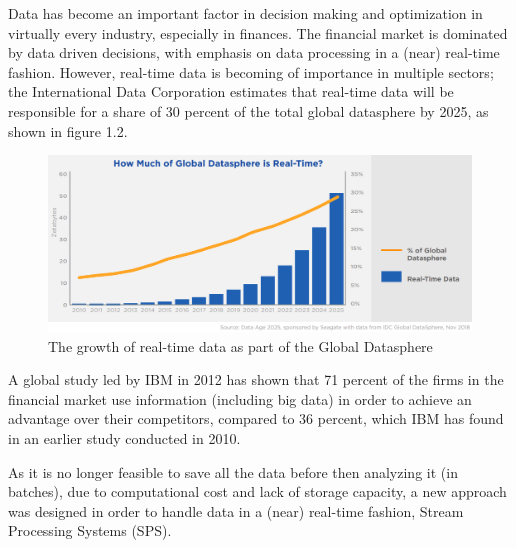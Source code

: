 Data has become an important factor in decision making and optimization in virtually every industry, especially in finances. 
The financial market is dominated by data driven decisions, with emphasis on data processing in a (near) real-time fashion.
However, real-time data is becoming of importance in multiple sectors; the International Data Corporation estimates that real-time data will be 
responsible for a share of 30 percent of the total global datasphere by 2025, as shown in figure 1.2.
\begin{figure}[h]
\centering
\includegraphics[width=1.0\textwidth]{Bilder/realtime_data.png}
\caption{The growth of real-time data as part of the Global Datasphere \cite[p.13]{idc-seagate-data}}
\label{fig:growth_realtime_data}
\end{figure}

A global study led by IBM in 2012 has shown that 71 percent of the firms in the financial market use information (including big data)
in order to achieve an advantage over their competitors, compared to 36 percent, which IBM has found in an earlier study conducted in 2010. \cite[p.1]{ibm-financial}

As it is no longer feasible to save all the data before then analyzing it (in batches), due to computational cost and lack of storage capacity, 
a new approach was designed in order to handle data in a (near) real-time fashion, Stream Processing Systems (SPS).

